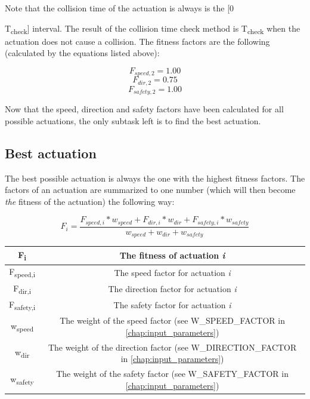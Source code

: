 Note that the collision time of the actuation is always is the [0 {T\textsubscript{check}] interval. The result of the collision time check method is T\textsubscript{check} when the actuation does not cause a collision. The fitness factors are the following (calculated by the equations listed above):

\[ F_{speed,2} = 1.00 \]
\[ F_{dir,2} = 0.75 \]
\[ F_{safety,2} = 1.00 \]

Now that the speed, direction and safety factors have been calculated for all possible actuations, the only subtask left is to find the best actuation.

\begin{minipage}{\textwidth}
\subsection{Best actuation}

The best possible actuation is always the one with the highest fitness factors. The factors of an actuation are summarized to one number (which will then become \textit{the} fitness of the actuation) the following way:

\[ F_{i} = \frac{F_{speed,i} * w_{speed} + F_{dir,i} * w_{dir} + F_{safety,i} * w_{safety}}{w_{speed} + w_{dir} + w_{safety}} \]
\end{minipage}

\begin{center}
    \begin{tabular}{ | c | c | }
        \hline
        F\textsubscript{i}  		& The fitness of actuation \textit{i}															\\
        \hline
        F\textsubscript{speed,i}  	& The speed factor for actuation \textit{i}														\\
        \hline
        F\textsubscript{dir,i}  	& The direction factor for actuation \textit{i}													\\
        \hline
        F\textsubscript{safety,i}  	& The safety factor for actuation \textit{i}													\\
        \hline
        w\textsubscript{speed}  	& The weight of the speed factor (see W\_SPEED\_FACTOR in \ref{chap:input_parameters})			\\
        \hline
        w\textsubscript{dir}  		& The weight of the direction factor (see W\_DIRECTION\_FACTOR in \ref{chap:input_parameters})	\\
        \hline
        w\textsubscript{safety}  	& The weight of the safety factor (see W\_SAFETY\_FACTOR in \ref{chap:input_parameters})		\\
        \hline
    \end{tabular}
\end{center}

}
